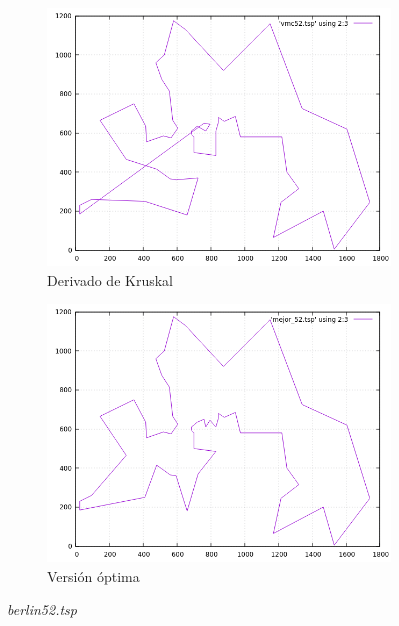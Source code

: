 \documentclass[12pt,spanish]{article}
\begin{document}
\begin{figure}[H]
\begin{subfigure}[b]{0.36\textwidth}
\includegraphics[width=\textwidth]{berlin52_vmc.png}
\caption{Derivado de Kruskal}
\end{subfigure}
\quad
\begin{subfigure}[b]{0.36\textwidth}
\includegraphics[width=\textwidth]{berlin52_mejor.png}
\caption{Versión óptima}
\end{subfigure}
\caption{\textit{berlin52.tsp}}
\end{figure}
\end{document}
